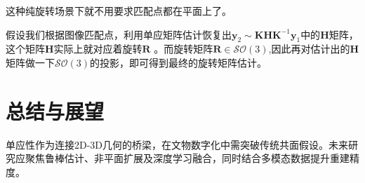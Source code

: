 \documentclass{article}
\begin{document}
这种纯旋转场景下就不用要求匹配点都在平面上了。

假设我们根据图像匹配点，利用单应矩阵估计恢复出$\mathbf{y}_2\sim\mathbf{KHK}^{-1}\mathbf{y}_1$中的$\mathbf{H}$矩阵，这个矩阵$\mathbf{H}$实际上就对应着旋转$\mathbf{R}$ 。而旋转矩阵$\mathbf{R}\in\mathcal{SO}(3)$,因此再对估计出的$\mathbf{H}$矩阵做一下$\mathcal{SO}(3)$的投影，即可得到最终的旋转矩阵估计。




\section{总结与展望}

单应性作为连接2D-3D几何的桥梁，在文物数字化中需突破传统共面假设。未来研究应聚焦鲁棒估计、非平面扩展及深度学习融合，同时结合多模态数据提升重建精度。


  
\label{EndBody}        


\newpage
\pagestyle{empty}





\end{document}
